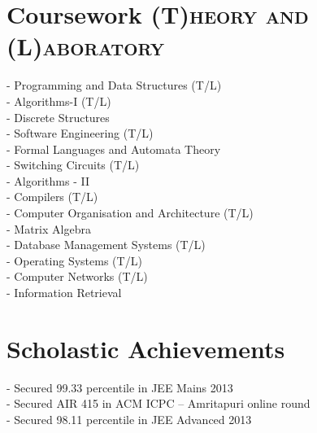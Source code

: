 \documentclass[a4paper,10pt]{extarticle} %
\begin{document}
\section{Coursework
\hfill\small\textsc{(T)heory and (L)aboratory}}

\begin{multicols}{2}
- Programming and Data Structures (T/L) \\
- Algorithms-I (T/L) \\
- Discrete Structures \\
- Software Engineering (T/L) \\
- Formal Languages and Automata Theory \\
- Switching Circuits (T/L) \\
- Algorithms - II \\
- Compilers (T/L) \\
- Computer Organisation and Architecture (T/L) \\
- Matrix Algebra \\
- Database Management Systems (T/L) \\
- Operating Systems (T/L) \\
- Computer Networks (T/L) \\
- Information Retrieval
\end{multicols}


\section{Scholastic Achievements}

- Secured 99.33 percentile in JEE Mains 2013 \\
- Secured AIR 415 in ACM ICPC – Amritapuri online round \\
- Secured 98.11 percentile in JEE Advanced 2013


\end{document}
